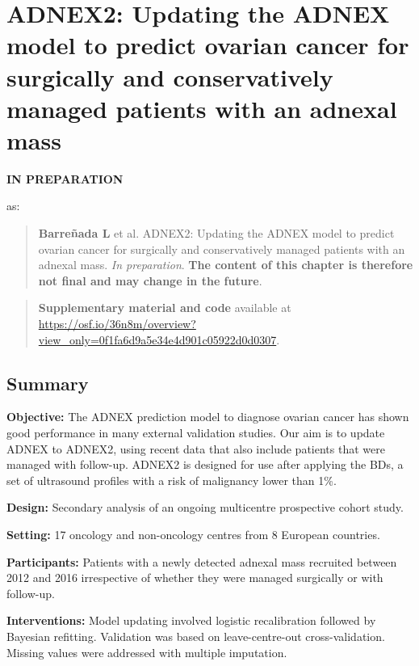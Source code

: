 \chapter[ADNEX2: Updating the ADNEX model]{ADNEX2: Updating the ADNEX model to predict ovarian cancer for
surgically and conservatively managed patients with an adnexal mass}
\label{sec:chp_ADNEX2}


\begin{flushleft}
{\huge\sffamily \textbf{IN PREPARATION}}
\end{flushleft}
as:
\begin{quote}
\textbf{Barreñada L} et al. ADNEX2: Updating the ADNEX model to predict ovarian cancer for surgically and conservatively managed patients with an adnexal mass. \textit{In preparation}. \textbf{The content of this chapter is therefore not final and may change in the future}.
\end{quote}

\begin{quote}
\textbf{Supplementary material and code} available at \url{https://osf.io/36n8m/overview?view_only=0f1fa6d9a5e34e4d901c05922d0d0307}.
\end{quote}
\vspace{-0.5em}
\normalsize\vspace{-0.5em}

\section*{Summary}\label{abstract}

\noindent\textbf{Objective:} The \gls{ADNEX} prediction model to diagnose ovarian cancer has shown good performance in many external validation studies. Our aim is to update \gls{ADNEX} to ADNEX2, using recent data that also include patients that were managed with follow-up. ADNEX2 is designed for use after applying the \glspl{BD}, a set of ultrasound profiles with a risk of malignancy lower than 1\%.

\noindent\textbf{Design:} Secondary analysis of an ongoing multicentre prospective cohort study.

\noindent\textbf{Setting:} 17 oncology and non-oncology centres from 8 European countries.

\noindent\textbf{Participants:} Patients with a newly detected adnexal mass recruited between 2012 and 2016 irrespective of whether they were managed surgically or with follow-up.

\noindent\textbf{Interventions:} Model updating involved logistic recalibration followed by Bayesian refitting. Validation was based on leave-centre-out cross-validation. Missing values were addressed with multiple imputation.

